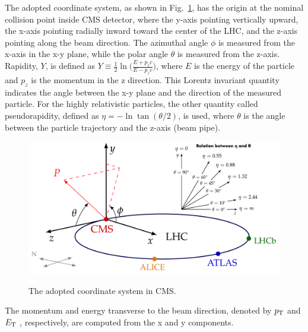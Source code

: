 The adopted coordinate system, as shown in Fig.~\ref{fig:cmscoordinate}, has the origin at the nominal collision point inside CMS detector, where the y-axis pointing vertically upward, the x-axis pointing radially inward toward the center of the LHC, and the z-axis pointing along the beam direction. The azimuthal angle $\phi$ is measured from the x-axis in the x-y plane, while the polar angle $\theta$ is measured from the z-axis. 
Rapidity, $\mathit{Y}$, is defined as $\mathit{Y}\equiv\frac{1}{2}\ln\big(\frac{E+p_{z}c}{E-p_{z}c}\big)$, where $E$ is the energy of the particle and $p_{z}$ is the momentum in the z direction.
This Lorentz invariant quantity indicates the angle between the x-y plane and the direction of the measured particle.
For the highly relativistic particles, the other quantity called pseudorapidity, defined as $\eta = -\ln \tan(\theta /2)$, is used, where $\theta$ is the angle between the particle trajectory and the z-axis (beam pipe).

\begin{figure}[!ht]
  \begin{center}
    \includegraphics[width=1.0\textwidth]{Fig/cms_coordinate}\\
    \caption{The adopted coordinate system in CMS. \label{fig:cmscoordinate}}
  \end{center}
\end{figure}

The momentum and energy transverse to the beam direction, denoted by $p_{\mathrm{T}}$ and $E_{\mathrm{T}}$ , respectively, are computed from the x and y components.

